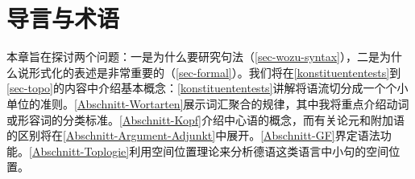 
\chapter{导言与术语}
\label{Kapitel-Grundbegriffe}



本章旨在探讨两个问题：一是为什么要研究句法（\ref{sec-wozu-syntax}），二是为什么说形式化的表述是非常重要的（\ref{sec-formal}）。我们将在\ref{konstituententests}到\ref{sec-topo}的内容中介绍基本概念：\ref{konstituententests}讲解将语流切分成一个个小单位的准则。\ref{Abschnitt-Wortarten}展示词汇聚合的规律，其中我将重点介绍动词或形容词的分类标准。\ref{Abschnitt-Kopf}介绍中心语的概念，而有关论元和附加语的区别将在\ref{Abschnitt-Argument-Adjunkt}中展开。\ref{Abschnitt-GF}界定语法功能。\ref{Abschnitt-Toplogie}利用空间位置理论来分析德语这类语言中小句的空间位置。

